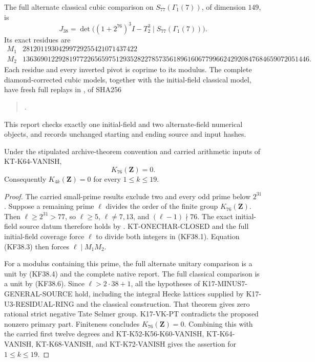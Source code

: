 The full alternate classical cubic comparison on
$S_{77}(\Gamma_1(7))$, of dimension $149$, is
\[
 J_{38}=\det\bigl((1+2^{76})^3I-T_2^3
                              \mid S_{77}(\Gamma_1(7))\bigr).
                                                               \tag{KF38.5}
\]
Its exact residues are
{\footnotesize
\[
\begin{array}{c|r}
 M_1&28120119304299729255421071437422\\
 M_2&13636901229281977226565975129352822785735618961606779966242920847684659072051446.
\end{array}                                                \tag{KF38.6}
\]
}
Each residue and every inverted pivot is coprime to its modulus.
The complete diamond-corrected cubic models, together with the
initial-field classical model, have fresh full replays in
, of SHA256
\begin{quote}\small
{}.
\end{quote}
This report checks exactly one initial-field and two
alternate-field numerical objects, and records unchanged
starting and ending source and input hashes.

\begin{theorem}[KT-K76-VANISH]
\label{thm:kt-k76-vanish}
Under the stipulated archive-theorem convention and carried
arithmetic inputs of KT-K64-VANISH,
\[
                         K_{76}(\mathbf Z)=0.
\]
Consequently $K_{4k}(\mathbf Z)=0$ for every $1\leq k\leq19$.
\end{theorem}
\begin{proof}
The carried small-prime results exclude two and every odd
prime below $2^{31}$.  Suppose a remaining prime $\ell$
divides the order of the finite group $K_{76}(\mathbf Z)$.
Then $\ell\geq2^{31}>77$, so $\ell\geq5$, $\ell\ne7,13$,
and $(\ell-1)\nmid76$.  The exact initial-field source datum
therefore holds by .
KT-ONECHAR-CLOSED and the full initial-field coverage force
$\ell$ to divide both integers in (KF38.1).  Equation (KF38.3)
then forces $\ell\mid M_1M_2$.

For a modulus containing this prime, the full alternate
unitary comparison is a unit by (KF38.4) and the complete
native report.  The full classical comparison is a unit
by (KF38.6).  Since $\ell>2\cdot38+1$, all the hypotheses
of K17-MINUS7-GENERAL-SOURCE hold, including the integral
Hecke lattices supplied by K17-U3-RESIDUAL-RING and the
classical construction.  That theorem gives zero rational
strict negative Tate Selmer group.  K17-VK-PT contradicts
the proposed nonzero primary part.  Finiteness concludes
$K_{76}(\mathbf Z)=0$.  Combining this with the carried
first twelve degrees and KT-K52-K56-K60-VANISH,
KT-K64-VANISH, KT-K68-VANISH, and KT-K72-VANISH gives
the assertion for $1\leq k\leq19$.
\end{proof}

